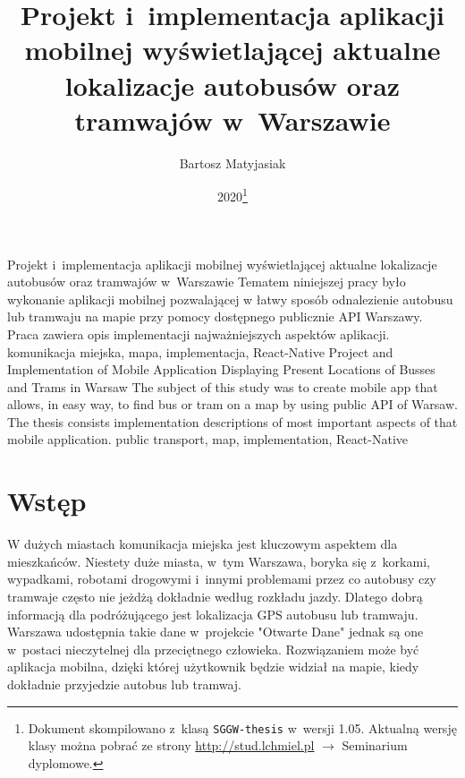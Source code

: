\documentclass{SGGW-thesis}
\title{Projekt i~implementacja aplikacji mobilnej wyświetlającej aktualne lokalizacje autobusów oraz tramwajów w~Warszawie}
\author{Bartosz Matyjasiak}
\date{2020\footnote{Dokument skompilowano z~klasą {\tt SGGW-thesis} w~wersji 1.05. Aktualną wersję klasy można pobrać ze strony \url{http://stud.lchmiel.pl} $\rightarrow$ Seminarium dyplomowe.}}
\begin{document}
\maketitle
\statementpage
\abstractpage
{Projekt i~implementacja aplikacji mobilnej wyświetlającej aktualne lokalizacje autobusów oraz tramwajów w~Warszawie}
{
Tematem niniejszej pracy było wykonanie aplikacji mobilnej pozwalającej w łatwy sposób odnalezienie autobusu lub tramwaju na mapie przy pomocy dostępnego publicznie API Warszawy.
Praca zawiera opis implementacji najważniejszych aspektów aplikacji.
}
{komunikacja miejska, mapa, implementacja, React-Native}
{Project and Implementation of Mobile Application Displaying Present Locations of Busses and Trams in Warsaw}
{
The subject of this study was to create mobile app that allows, in easy way, to find bus or tram on a map by using public API of Warsaw.
The thesis consists implementation descriptions of most important aspects of that mobile application.
}
{public transport, map, implementation, React-Native}


{
  \doublespacing
  \tableofcontents
}

\startchapterfromoddpage %


\chapter{Wstęp}
W dużych miastach komunikacja miejska jest kluczowym aspektem dla mieszkańców.
Niestety duże miasta, w~tym Warszawa, boryka się z~korkami, wypadkami, robotami drogowymi i~innymi problemami przez
co autobusy czy tramwaje często nie jeżdżą dokładnie według rozkładu jazdy.
Dlatego dobrą informacją dla podróżującego jest lokalizacja GPS autobusu lub tramwaju.
Warszawa udostępnia takie dane w~projekcie "Otwarte Dane" \cite{APIWARSZAWA} jednak są one w~postaci nieczytelnej dla przeciętnego człowieka.
Rozwiązaniem może być aplikacja mobilna, dzięki której użytkownik będzie widział na mapie, kiedy dokładnie przyjedzie autobus lub tramwaj.
\end{document}
